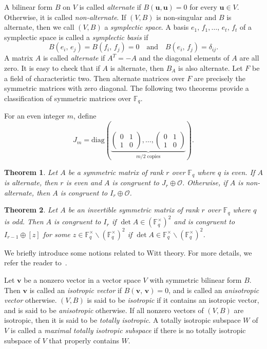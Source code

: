 \documentclass{article}
\newtheorem{theorem}{Theorem}[section]
\theoremstyle{definition}
\theoremstyle{remark}
\begin{document}
A bilinear form $B$ on $V$ is called \textit{alternate} if $B(\mathbf{u}, \mathbf{u})=0$ for every $\mathbf{u}\in V$. Otherwise, it is called \textit{non-alternate}. If $(V, B)$ is non-singular and $B$ is alternate, then we call $(V, B)$ a \textit{symplectic space}. A basis $e_1,\,f_1,\ldots,\,e_t,\,f_t$ of a symplectic space is called a \textit{symplectic basis} if
\[
B(e_i,\,e_j)=B(f_i,\,f_j)=0\quad\mbox{and}\quad B(e_i,\,f_j)=\delta_{ij}.
\]
A matrix $A$ is called \textit{alternate} if $A^T=-A$ and the diagonal elements of $A$ are all zero. It is easy to check that if $A$ is alternate, then $B_A$ is also alternate. Let $F$ be a field of characteristic two. Then alternate matrices over $F$ are precisely the symmetric matrices with zero diagonal. The following two theorems provide a classification of symmetric matrices over $\mathbb{F}_q$.

For an even integer $m$, define
\[
    J_m=
    \mathrm{diag}\left(
    \underbrace{
    \begin{pmatrix}
    0&1\\
    1&0
    \end{pmatrix},
    \ldots,
    \begin{pmatrix}
    0&1\\
    1&0
    \end{pmatrix}
    }_{m/2\text{ copies}}
    \right).
\]

\begin{theorem}\cite{A-1938}\label{cong_2}
    Let $A$ be a symmetric matrix of rank $r$ over $\mathbb{F}_q$ where $q$ is even. If $A$ is alternate, then $r$ is even and $A$ is congruent to $J_r\oplus\mathcal{O}$. Otherwise, if $A$ is non-alternate, then $A$ is congruent to $I_r\oplus \mathcal{O}$.
\end{theorem}

\begin{theorem}\cite{G-2010}\label{congclass}
    Let $A$ be an invertible symmetric matrix of rank $r$ over $\mathbb{F}_q$ where $q$ is odd. Then $A$ is congruent to $I_r$ if $\det A\in (\mathbb{F}_q^\times)^2$ and is congruent to $I_{r-1}\oplus[z]$ for some $z\in \mathbb{F}_q^\times\backslash(\mathbb{F}_q^\times)^2$ if $\det A\in \mathbb{F}_q^\times\backslash(\mathbb{F}_q^\times)^2$.
\end{theorem}

We briefly introduce some notions related to Witt theory. For more details, we refer the reader to~\cite{L-2005}.

Let $\mathbf{v}$ be a nonzero vector in a vector space $V$ with symmetric bilinear form $B$. Then $\mathbf{v}$ is called an \textit{isotropic vector} if $B(\mathbf{v},\,\mathbf{v})=0$, and is called an \textit{anisotropic vector} otherwise. $(V, B)$ is said to be \textit{isotropic} if it contains an isotropic vector, and is said to be \textit{anisotropic} otherwise. If all nonzero vectors of $(V, B)$ are isotropic, then it is said to be \textit{totally isotropic}. A totally isotropic subspace $W$ of $V$ is called a \textit{maximal totally isotropic subspace} if there is no totally isotropic subspace of $V$ that properly contains $W$.
\end{document}
